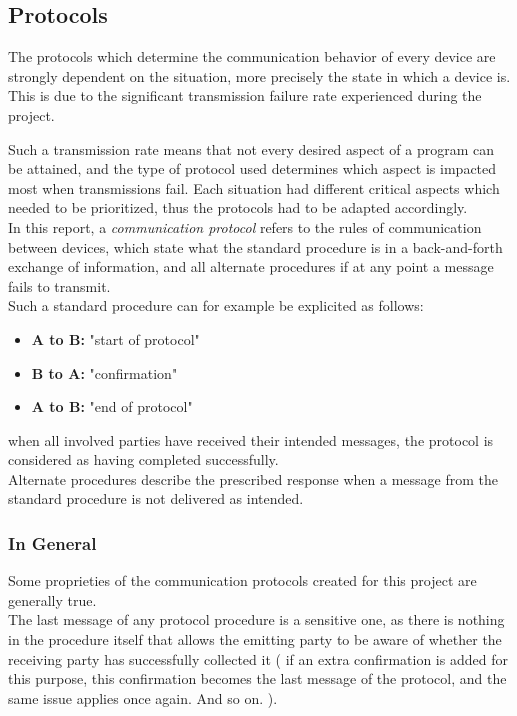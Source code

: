 \subsection{Protocols}

The protocols which determine the communication behavior of every device are strongly dependent on the situation, more precisely the state in which a device is. \\

This is due to the significant transmission failure rate experienced during the project. 

Such a transmission rate means that not every desired aspect of a program can be attained, and the type of protocol used determines which aspect is impacted most when transmissions fail. Each situation had different critical aspects which needed to be prioritized, thus the protocols had to be adapted accordingly.\\

In this report, a \textit{communication protocol} refers to the rules of communication between devices, which state what the standard procedure is in a back-and-forth exchange of information, and all alternate procedures if at any point a message fails to transmit.\\

Such a standard procedure can for example be explicited as follows:
\begin{itemize}
\item[] \textbf{A to B:} "start of protocol"
\item[] \textbf{B to A:} "confirmation"
\item[] \textbf{A to B:} "end of protocol"
\end{itemize}

when all involved parties have received their intended messages, the protocol is considered as having completed successfully.\\

Alternate procedures describe the prescribed response when a message from the standard procedure is not delivered as intended.

\subsubsection{In General}

Some proprieties of the communication protocols created for this project are generally true.\\

The last message of any protocol procedure is a sensitive one, as there is nothing in the procedure itself that allows the emitting party to be aware of whether the receiving party has successfully collected it ( if an extra confirmation is added for this purpose, this confirmation becomes the last message of the protocol, and the same issue applies once again. And so on. ). \\

